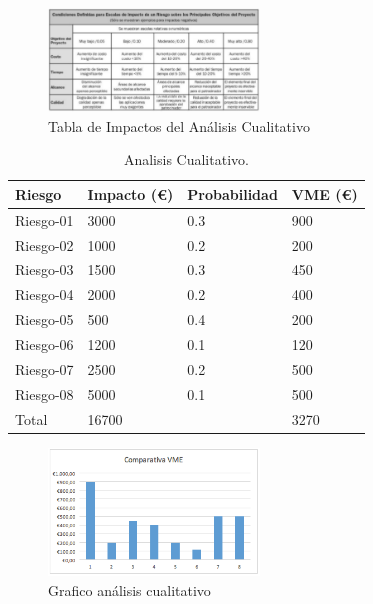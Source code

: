 \begin{figure}[H]
\begin{center}
\includegraphics[width=0.5\textwidth]{./img/ImpactoAnalisisCualitativo.png}
\end{center}
\caption{Tabla de Impactos del Análisis Cualitativo}
\label{tab:Tabla de Impactos del Análisis Cualitativo}
\end{figure}

\begin{table}[h]
\begin{center}
\begin{tabular}{ l l l l }
\hline
	Riesgo & Impacto (€) & Probabilidad & VME (€) \\ \hline \hline
	Riesgo-01 & 3000 & 0.3 & 900 \\ \hline
	Riesgo-02 & 1000 & 0.2 & 200 \\ \hline
	Riesgo-03 & 1500 & 0.3 & 450 \\ \hline
	Riesgo-04 & 2000 & 0.2 & 400 \\ \hline
	Riesgo-05 & 500 & 0.4 & 200 \\ \hline
	Riesgo-06 & 1200 & 0.1 & 120 \\ \hline
	Riesgo-07 & 2500 & 0.2 & 500 \\ \hline
	Riesgo-08 & 5000 & 0.1 & 500 \\ \hline
	Total & 16700 &  & 3270 \\ \hline
\end{tabular}
\caption{Analisis Cualitativo.}
\label{Analisis Cualitativo}
\end{center}
\end{table}

\begin{figure}[H]
\begin{center}
\includegraphics[width=0.5\textwidth]{./img/grafico2.png}
\end{center}
\caption{Grafico análisis cualitativo}
\label{tab:Grafico análisis cualitativo}
\end{figure}

